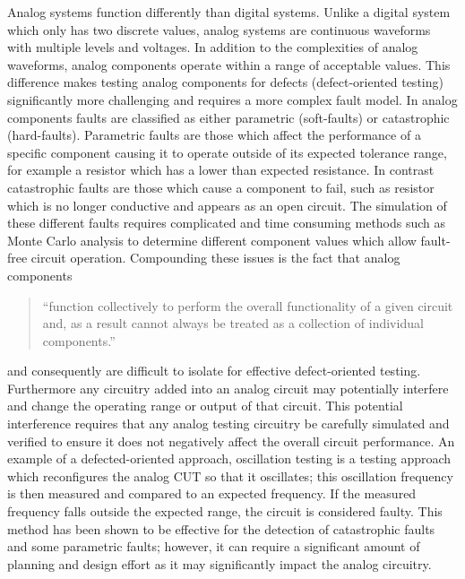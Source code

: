 \documentclass[12pt]{report}
\begin{document}
Analog systems function differently than digital systems.  Unlike a digital system which only has two discrete values, analog systems are continuous waveforms with multiple levels and voltages\cite{syschip}.  In addition to the complexities of analog waveforms, analog components operate within a range of acceptable values\cite{syschip}.  This difference makes testing analog components for defects (defect-oriented testing) significantly more challenging and requires a more complex fault model.  In analog components faults are classified as either parametric (soft-faults) or catastrophic (hard-faults)\cite{analogfaults}.  Parametric faults are those which affect the performance of a specific component causing it to operate outside of its expected tolerance range, for example a resistor which has a lower than expected resistance.  In contrast catastrophic faults are those which cause a component to fail, such as resistor which is no longer conductive and appears as an open circuit\cite{analogfaults}.  The simulation of these different faults requires complicated and time consuming methods such as Monte Carlo analysis to determine different component values which allow fault-free circuit operation\cite{syschip}.  Compounding these issues is the fact that analog components
\begin{quote}
``function collectively to perform the overall functionality of a given circuit and, as a result cannot always be treated as a collection of individual components\cite{syschip}.''
\end{quote}
and consequently are difficult to isolate for effective defect-oriented testing\cite{analogmixedtest}.  Furthermore any circuitry added into an analog circuit may potentially interfere and change the operating range or output of that circuit\cite{syschip}.  This potential interference requires that any analog testing circuitry be carefully simulated and verified to ensure it does not negatively affect the overall circuit performance.  An example of a defected-oriented approach, oscillation testing is a testing approach which reconfigures the analog CUT so that it oscillates; this oscillation frequency is then measured and compared to an expected frequency.  If the measured frequency falls outside the expected range, the circuit is considered faulty\cite{analogosc}.  This method has been shown to be effective for the detection of catastrophic faults and some parametric faults; however, it can require a significant amount of planning and design effort as it may significantly impact the analog circuitry\cite{analogosc}\cite{syschip}.
\end{document}
